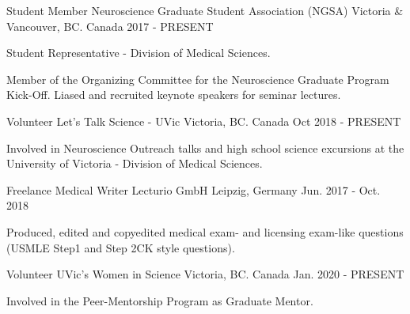 \begin{cventries}
  \cventry
    {Student Member} %
    {Neuroscience Graduate Student Association (NGSA)} %
    {Victoria \& Vancouver, BC. Canada} %
    {2017 - PRESENT} %
    {
      \begin{cvitems} %
        \item {Student Representative - Division of Medical Sciences.}
        \item {Member of the Organizing Committee for the Neuroscience Graduate Program Kick-Off. Liased and recruited keynote speakers for seminar lectures.}
      \end{cvitems}
    }
    \cventry
    {Volunteer} %
    {Let's Talk Science - UVic} %
    {Victoria, BC. Canada} %
    {Oct 2018 - PRESENT} %
    {
    \begin{cvitems} %
    \item {Involved in Neuroscience Outreach talks and high school science excursions at the University of Victoria - Division of Medical Sciences.}
    \end{cvitems}
    }
\vspace{10pt}
    \cventry
    {Freelance Medical Writer} %
    {Lecturio GmbH} %
    {Leipzig, Germany} %
    {Jun. 2017 - Oct. 2018} %
    {
    \begin{cvitems} %
      \item {Produced, edited and copyedited medical exam- and licensing exam-like questions (USMLE Step1 and Step 2CK style questions).}
    \end{cvitems}
    } 
\vspace{5pt} 
  \cventry
    {Volunteer} %
    {UVic's Women in Science} %
    {Victoria, BC. Canada} %
    {Jan. 2020 - PRESENT} %
    {
      \begin{cvitems} %
        \item {Involved in the Peer-Mentorship Program as Graduate Mentor.}
      \end{cvitems}
    }


\end{cventries}
